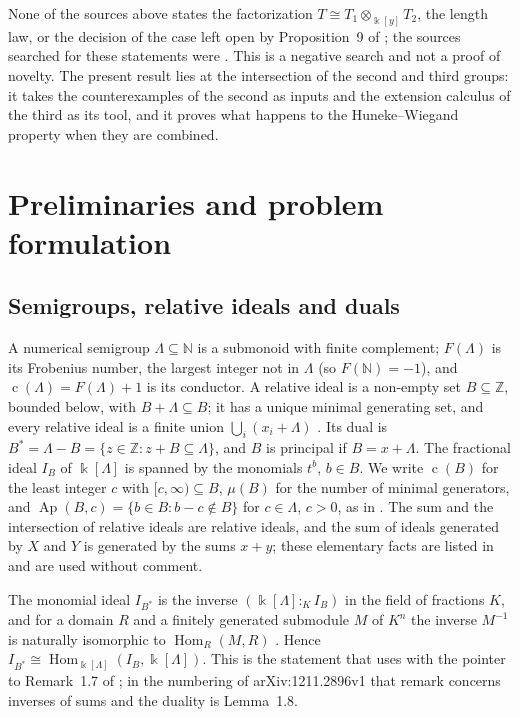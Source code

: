\documentclass[11pt]{article}
\theoremstyle{definition}
\theoremstyle{remark}
\newcommand{\N}{\mathbb{N}}
\newcommand{\Z}{\mathbb{Z}}
\newcommand{\kk}{\Bbbk}
\newcommand{\Ap}{\operatorname{Ap}}
\newcommand{\cond}{\operatorname{c}}
\begin{document}
None of the sources above states the factorization $T\cong T_1\otimes_{\kk[y]}T_2$, the length law, or the
decision of the case left open by Proposition~9 of \cite{GarciaSanchezLeamer2013}; the sources searched for
these statements were \cite{GarciaSanchezLeamer2013,GotoTakahashiTaniguchiTruong2013,Leamer2012,Roy2018}. This
is a negative search and not a proof of novelty. The present result lies at the intersection of the second and
third groups: it takes the counterexamples of the second as inputs and the extension calculus of the third as its
tool, and it proves what happens to the Huneke--Wiegand property when they are combined.

\section{Preliminaries and problem formulation}\label{sec:prelim}

\subsection{Semigroups, relative ideals and duals}

A numerical semigroup $\Lambda\subseteq\N$ is a submonoid with finite complement; $F(\Lambda)$ is its Frobenius
number, the largest integer not in $\Lambda$ (so $F(\N)=-1$), and $\cond(\Lambda)=F(\Lambda)+1$ is its conductor. A
relative ideal is a non-empty set $B\subseteq\Z$, bounded below, with $B+\Lambda\subseteq B$; it has a unique
minimal generating set, and every relative ideal is a finite union $\bigcup_i(x_i+\Lambda)$
\cite[Section~1]{GarciaSanchezLeamer2013}. Its dual is $B^*=\Lambda-B=\{z\in\Z:z+B\subseteq\Lambda\}$, and $B$ is
principal if $B=x+\Lambda$. The fractional ideal $I_B$ of $\kk[\Lambda]$ is spanned by the monomials $t^b$,
$b\in B$. We write $\cond(B)$ for the least integer $c$ with $[c,\infty)\subseteq B$, $\mu(B)$ for the number of
minimal generators, and $\Ap(B,c)=\{b\in B:b-c\notin B\}$ for $c\in\Lambda$, $c>0$, as in
\cite[Section~2]{GarciaSanchezLeamer2013}. The sum and the intersection of relative ideals are relative ideals, and the sum of ideals
generated by $X$ and $Y$ is generated by the sums $x+y$; these elementary facts are listed in \cite[Section~1]{GarciaSanchezLeamer2013} and are used without comment.

The monomial ideal $I_{B^*}$ is the inverse $(\kk[\Lambda]:_KI_B)$ in the field of fractions $K$, and for a
domain $R$ and a finitely generated submodule $M$ of $K^n$ the inverse $M^{-1}$ is naturally isomorphic to
$\operatorname{Hom}_R(M,R)$ \cite[Definition~1.6 and Lemma~1.8]{Leamer2012}. Hence
$I_{B^*}\cong\operatorname{Hom}_{\kk[\Lambda]}(I_B,\kk[\Lambda])$. This is the statement that
\cite[Corollary~7]{GarciaSanchezLeamer2013} uses with the pointer to Remark~1.7 of \cite{Leamer2012}; in the
numbering of arXiv:1211.2896v1 that remark concerns inverses of sums and the duality is Lemma~1.8.
\end{document}
